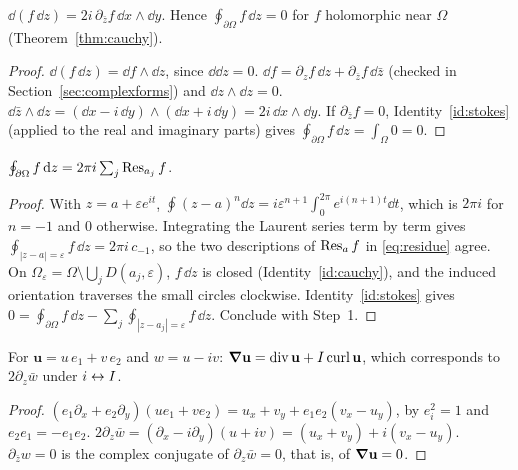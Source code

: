 \begin{identity}\label{id:cauchy}
$\dd(f\,\dd z)=2i\,\partial_{\bar z}f\,\dd x\wedge\dd y$. Hence $\oint_{\partial\Omega}f\,\dd z=0$ for $f$ holomorphic near $\Omega$ (Theorem~\ref{thm:cauchy}).
\end{identity}
\begin{proof}
 $\dd(f\,\dd z)=\dd f\wedge\dd z$, since $\dd\dd z=0$.
 $\dd f=\partial_zf\,\dd z+\partial_{\bar z}f\,\dd\bar z$ (checked in Section~\ref{sec:complexforms}) and $\dd z\wedge\dd z=0$.
 $\dd\bar z\wedge\dd z=(\dd x-i\,\dd y)\wedge(\dd x+i\,\dd y)=2i\,\dd x\wedge\dd y$.
 If $\partial_{\bar z}f=0$, Identity~\ref{id:stokes} (applied to the real and imaginary parts) gives $\oint_{\partial\Omega}f\,\dd z=\int_\Omega0=0$.
\end{proof}

\begin{identity}\label{id:residue}
$\oint_{\partial\Omega}f\,\mathrm{d} z=2\pi i\sum_j\operatorname{Res}_{a_j}f$.
\end{identity}
\begin{proof}
 With $z=a+\varepsilon e^{it}$, $\oint(z-a)^n\dd z=i\varepsilon^{n+1}\int_0^{2\pi}e^{i(n+1)t}\dd t$, which is $2\pi i$ for $n=-1$ and $0$ otherwise.
Integrating the Laurent series term by term gives $\oint_{|z-a|=\varepsilon}f\,\dd z=2\pi i\,c_{-1}$, so the two descriptions of $\operatorname{Res}_af$ in \eqref{eq:residue} agree.
 On $\Omega_\varepsilon=\Omega\setminus\bigcup_jD(a_j,\varepsilon)$, $f\,\dd z$ is closed (Identity~\ref{id:cauchy}), and the induced orientation traverses the small circles clockwise.
Identity~\ref{id:stokes} gives $0=\oint_{\partial\Omega}f\,\dd z-\sum_j\oint_{|z-a_j|=\varepsilon}f\,\dd z$. Conclude with Step~1.
\end{proof}

\begin{identity}[Cauchy--Riemann as $\vd\mathbf u=0$; Proposition~\ref{prop:CRga}]\label{id:CRga}
For $\mathbf u=u\,e_1+v\,e_2$ and $w=u-iv$: $\boldsymbol{\nabla}\mathbf u=\operatorname{div}\mathbf u+I\operatorname{curl}\mathbf u$, which corresponds to $2\partial_z\bar w$ under $i\leftrightarrow I$.
\end{identity}
\begin{proof}
 $(e_1\partial_x+e_2\partial_y)(ue_1+ve_2)=u_x+v_y+e_1e_2(v_x-u_y)$, by $e_i^2=1$ and $e_2e_1=-e_1e_2$.
 $2\partial_z\bar w=(\partial_x-i\partial_y)(u+iv)=(u_x+v_y)+i(v_x-u_y)$.
 $\partial_{\bar z}w=0$ is the complex conjugate of $\partial_z\bar w=0$, that is, of $\vd\mathbf u=0$.
\end{proof}

